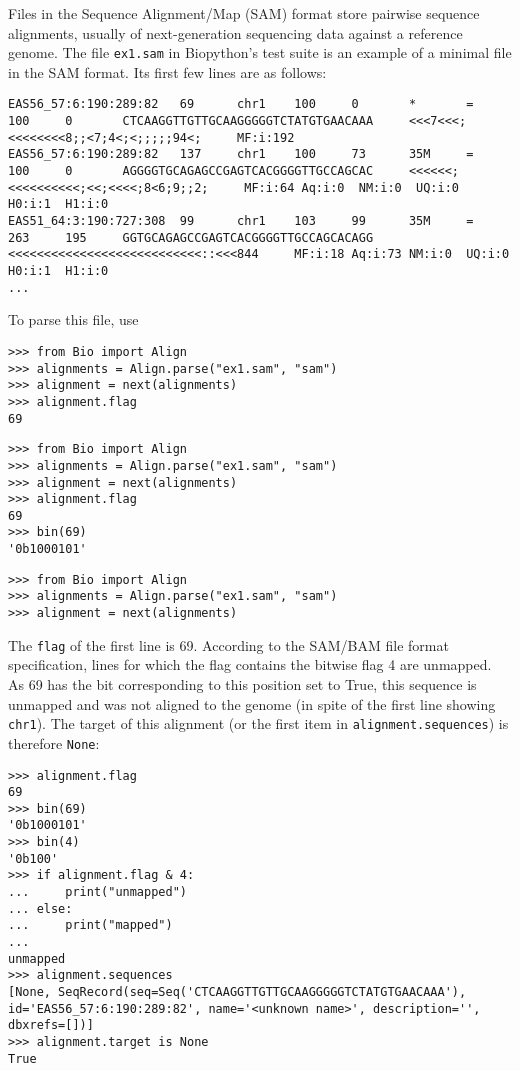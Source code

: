 Files in the Sequence Alignment/Map (SAM) format \cite{li2009} store pairwise sequence alignments, usually of next-generation sequencing data against a reference genome. The file \verb+ex1.sam+ in Biopython's test suite is an example of a minimal file in the SAM format. Its first few lines are as follows:
\begin{verbatim}
EAS56_57:6:190:289:82   69      chr1    100     0       *       =       100     0       CTCAAGGTTGTTGCAAGGGGGTCTATGTGAACAAA     <<<7<<<;<<<<<<<<8;;<7;4<;<;;;;;94<;     MF:i:192
EAS56_57:6:190:289:82   137     chr1    100     73      35M     =       100     0       AGGGGTGCAGAGCCGAGTCACGGGGTTGCCAGCAC     <<<<<<;<<<<<<<<<<;<<;<<<<;8<6;9;;2;     MF:i:64 Aq:i:0  NM:i:0  UQ:i:0  H0:i:1  H1:i:0
EAS51_64:3:190:727:308  99      chr1    103     99      35M     =       263     195     GGTGCAGAGCCGAGTCACGGGGTTGCCAGCACAGG     <<<<<<<<<<<<<<<<<<<<<<<<<<<::<<<844     MF:i:18 Aq:i:73 NM:i:0  UQ:i:0  H0:i:1  H1:i:0
...
\end{verbatim}
To parse this file, use
\begin{verbatim}
>>> from Bio import Align
>>> alignments = Align.parse("ex1.sam", "sam")
>>> alignment = next(alignments)
>>> alignment.flag
69
\end{verbatim}
\begin{verbatim}
>>> from Bio import Align
>>> alignments = Align.parse("ex1.sam", "sam")
>>> alignment = next(alignments)
>>> alignment.flag
69
>>> bin(69)
'0b1000101'
\end{verbatim}
\begin{verbatim}
>>> from Bio import Align
>>> alignments = Align.parse("ex1.sam", "sam")
>>> alignment = next(alignments)
\end{verbatim}
The \verb|flag| of the first line is 69. According to the SAM/BAM file format specification, lines for which the flag contains the bitwise flag 4 are unmapped. As 69 has the bit corresponding to this position set to True, this sequence is unmapped and was not aligned to the genome (in spite of the first line showing \verb|chr1|). The target of this alignment (or the first item in \verb|alignment.sequences|) is therefore \verb|None|:
\begin{verbatim}
>>> alignment.flag
69
>>> bin(69)
'0b1000101'
>>> bin(4)
'0b100'
>>> if alignment.flag & 4:
...     print("unmapped")
... else:
...     print("mapped")
...
unmapped
>>> alignment.sequences
[None, SeqRecord(seq=Seq('CTCAAGGTTGTTGCAAGGGGGTCTATGTGAACAAA'), id='EAS56_57:6:190:289:82', name='<unknown name>', description='', dbxrefs=[])]
>>> alignment.target is None
True
\end{verbatim}
